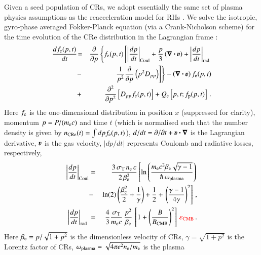 \documentclass[fleqn,usenatbib,useAMS]{mnras}
\newcommand{\bcdot}{\ensuremath{%
  \mathchoice%
   {\mskip\thinmuskip\lower0.2ex\hbox{\scalebox{1.5}{$\cdot$}}\mskip\thinmuskip}}%
   {\mskip\thinmuskip\lower0.2ex\hbox{\scalebox{1.5}{$\cdot$}}\mskip\thinmuskip}%
   {\lower0.3ex\hbox{\scalebox{1.2}{$\cdot$}}}%
   {\lower0.3ex\hbox{\scalebox{1.2}{$\cdot$}}}%
}
\newcommand\cp[1]{{\color{red} #1}}
\newcommand{\bvel}{\ensuremath{\boldsymbol{\varv}}}
\newcommand{\bnabla}{\ensuremath{\boldsymbol{\nabla}}}
\newcommand{\eps}{\varepsilon}
\begin{document}
Given a seed population of CRs, we adopt essentially the same set of
plasma physics assumptions as the reacceleration model for RHs
\citep{brunetti07,brunetti11}. We solve the isotropic, gyro-phase
averaged Fokker-Planck equation (via a Crank-Nicholson scheme) for the
time evolution of the CRe distribution in the Lagrangian frame
\citep{brunetti07,brunetti11}:
\begin{eqnarray}
{{d f_{\rmn{e}}(p,t)}\over{d t}} &\!=&
\frac{\partial}{\partial p}
\left\{
f_{\rmn{e}}(p,t)\left[
\left|\frac{d p}{d t}\right|_{\rm Coul} 
+ \frac{p}{3}\left(\bnabla\bcdot \bvel\right)
+ \left|\frac{d p}{d t}\right|_{\rm rad}\right.\right.
\nonumber\\
&-& \left.\left.{1\over{p^2}}{{\partial }\over{\partial p}}\left(p^2 D_{pp}\right) 
\right]\right\} - \left(\bnabla\bcdot \bvel\right) f_{\rmn{e}}(p,t)
\nonumber\\
&+& {{\partial^2 }\over{\partial p^2}}
\left[
D_{pp} f_{\rmn{e}}(p,t) \right]+ Q_{\rmn{e}}\left[p,t;f_{\rmn{p}}(p,t)\right]   \, .
\label{elettroni}
\end{eqnarray}
Here $f_{{\mathrm{e}}}$ is the one-dimensional distribution in position $x$
(suppressed for clarity), momentum \cp{$p=P/(m_{{\mathrm{e}}} c)$} and time $t$
(which is normalised such that the number density is given by
$n_{{\mathrm{CRe}}}(t)=\int d p f_{{\mathrm{e}}}(p,t)$), $d/d t=\partial/\partial
t+\bvel\bcdot\bnabla$ is the Lagrangian derivative, $\bvel$ is the gas velocity,
$|d p/d t|$ represents Coulomb \citep[Coul,][]{1972Phy....60..145G} and
radiative \citep[rad,][]{1979rpa..book.....R} losses, respectively,
\begin{eqnarray}
   \left|\frac{d p}{d t}\right|_{\rm Coul} &=& \frac{3\,\sigma_\rmn{T}\,n_{\rmn{e}}\,c}{2\, \beta_{\rmn{e}}^2}
  \left[\ln\left(\frac{m_{\rmn{e}} c^2 \beta_{\rmn{e}} \sqrt{\gamma-1}}{\hbar\,\omega_\rmn{plasma}}\right)\right.\nonumber \\
    &-&\ln(2)\left(\frac{\beta_{\rmn{e}}^2}{2}+\frac{1}{\gamma}\right)+\frac{1}{2}+
    \left.\left(\frac{\gamma-1}{4\gamma}\right)^2\right]\,, \\
  \left|\frac{d p}{d t}\right|_{\rm rad~} &=& \frac{4}{3}\frac{\sigma_\rmn{T}}{m_{\rmn{e}}c}\,
  \frac{p^2}{\beta_{\rmn{e}}}\,\left[1+\left(\frac{B}{B_\rmn{CMB}}\right)^2\right]\,\cp{\eps_{\rmn{CMB}}}\,.
\end{eqnarray}
Here $\beta_{{\mathrm{e}}} = p/\sqrt{1+p^2}$ is the dimensionless velocity of CRs,
$\gamma=\sqrt{1+p^2}$ is the Lorentz factor of CRs,
$\omega_{\mathrm{plasma}} = \sqrt{4\pi e^2 n_{{\mathrm{e}}} / m_{{\mathrm{e}}}}$ is the plasma
\end{document}
